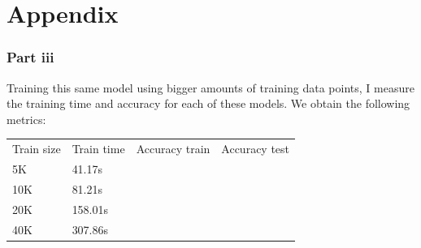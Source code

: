 \documentclass[10pt]{article}
\begin{document}
\section*{Appendix}


\subsubsection*{Part iii}
Training this same model using bigger amounts of training data
points, I measure the training time and accuracy for each of these
models. We obtain the following metrics:

\vspace{5mm} %

\begin{table}
\centering
\begin{tabular}{llll}
    Train size & Train time & Accuracy train & Accuracy test  \\
    5K         & 41.17s     &                &                \\
    10K        & 81.21s     &                &                \\
    20K        & 158.01s    &                &                \\   
    40K        & 307.86s    &                &               
\end{tabular}
\end{table}
\end{document}
